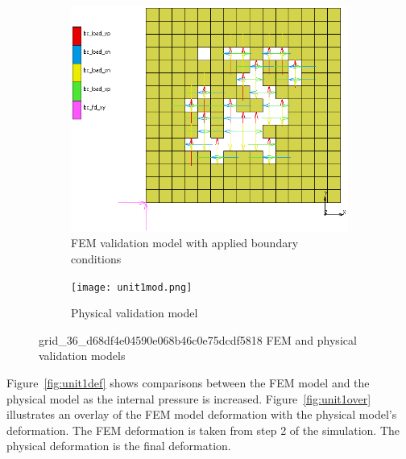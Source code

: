 \begin{figure}[H]
	\centering
	\begin{subfigure}[t]{0.5\textwidth}
		\includegraphics[width=\textwidth]{unit1bc.png}
		\caption{FEM validation model with applied boundary conditions}
		\label{fig:unit1bc}
	\end{subfigure}
	\hfill
	\begin{subfigure}[t]{0.4\textwidth}
		\centering
		\texttt{[image: unit1mod.png]}
		\caption{Physical validation model}
		\label{fig:unit1mod}
	\end{subfigure}
	\caption[FEM and physical models of unit 1]{grid\_36\_d68df4e04590e068b46c0e75dcdf5818 FEM and physical validation models}
	\label{fig:unit1}
\end{figure}

Figure~\ref{fig:unit1def} shows comparisons between the FEM model and the physical model as the internal pressure is increased. Figure~\ref{fig:unit1over} illustrates an overlay of the FEM model deformation with the physical model's deformation. The FEM deformation is taken from step 2 of the simulation. The physical deformation is the final deformation.

